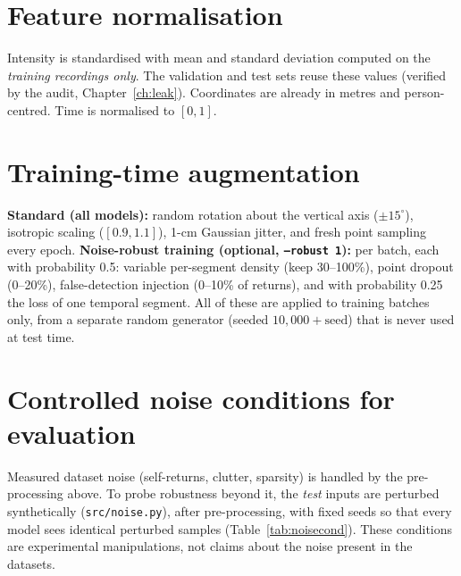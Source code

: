 \section{Feature normalisation}
Intensity is standardised with mean and standard deviation computed on the
\emph{training recordings only}. The validation and test sets reuse these values
(verified by the audit, Chapter~\ref{ch:leak}). Coordinates are already in
metres and person-centred. Time is normalised to $[0,1]$.

\section{Training-time augmentation}
\label{sec:aug}
\textbf{Standard (all models):} random rotation about the vertical axis
($\pm15^\circ$), isotropic scaling ($[0.9,1.1]$), 1-cm Gaussian jitter, and fresh
point sampling every epoch. \textbf{Noise-robust training (optional,
\texttt{--robust 1}):} per batch, each with probability 0.5: variable per-segment
density (keep 30--100\%), point dropout (0--20\%), false-detection injection
(0--10\% of returns), and with probability 0.25 the loss of one temporal segment.
All of these are applied to training batches only, from a separate random
generator (seeded $10{,}000+\mathrm{seed}$) that is never used at test time.

\section{Controlled noise conditions for evaluation}
Measured dataset noise (self-returns, clutter, sparsity) is handled by the
pre-processing above. To probe robustness beyond it, the \emph{test} inputs are
perturbed synthetically (\texttt{src/noise.py}), after pre-processing, with fixed
seeds so that every model sees identical perturbed samples
(Table~\ref{tab:noisecond}). These conditions are experimental manipulations,
not claims about the noise present in the datasets.

